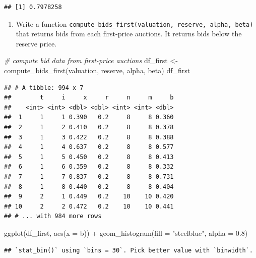 \documentclass[
]{book}
\newenvironment{Shaded}{\begin{snugshade}}{\end{snugshade}}
\newcommand{\AttributeTok}[1]{\textcolor[rgb]{0.77,0.63,0.00}{#1}}
\newcommand{\CommentTok}[1]{\textcolor[rgb]{0.56,0.35,0.01}{\textit{#1}}}
\newcommand{\FloatTok}[1]{\textcolor[rgb]{0.00,0.00,0.81}{#1}}
\newcommand{\FunctionTok}[1]{\textcolor[rgb]{0.00,0.00,0.00}{#1}}
\newcommand{\NormalTok}[1]{#1}
\newcommand{\OtherTok}[1]{\textcolor[rgb]{0.56,0.35,0.01}{#1}}
\newcommand{\SpecialCharTok}[1]{\textcolor[rgb]{0.00,0.00,0.00}{#1}}
\newcommand{\StringTok}[1]{\textcolor[rgb]{0.31,0.60,0.02}{#1}}
\providecommand{\tightlist}{%
  \setlength{\itemsep}{0pt}\setlength{\parskip}{0pt}}
\begin{document}
\begin{verbatim}
## [1] 0.7978258
\end{verbatim}

\begin{enumerate}
\def\labelenumi{\arabic{enumi}.}
\setcounter{enumi}{4}
\tightlist
\item
  Write a function \texttt{compute\_bids\_first(valuation,\ reserve,\ alpha,\ beta)} that returns bids from each first-price auctions. It returns bids below the reserve price.
\end{enumerate}

\begin{Shaded}
\begin{Highlighting}[]
\CommentTok{\# compute bid data from first{-}price auctions}
\NormalTok{df\_first }\OtherTok{\textless{}{-}} \FunctionTok{compute\_bids\_first}\NormalTok{(valuation, reserve, alpha, beta)}
\NormalTok{df\_first}
\end{Highlighting}
\end{Shaded}

\begin{verbatim}
## # A tibble: 994 x 7
##        t     i     x     r     n     m     b
##    <int> <int> <dbl> <dbl> <int> <int> <dbl>
##  1     1     1 0.390   0.2     8     8 0.360
##  2     1     2 0.410   0.2     8     8 0.378
##  3     1     3 0.422   0.2     8     8 0.388
##  4     1     4 0.637   0.2     8     8 0.577
##  5     1     5 0.450   0.2     8     8 0.413
##  6     1     6 0.359   0.2     8     8 0.332
##  7     1     7 0.837   0.2     8     8 0.731
##  8     1     8 0.440   0.2     8     8 0.404
##  9     2     1 0.449   0.2    10    10 0.420
## 10     2     2 0.472   0.2    10    10 0.441
## # ... with 984 more rows
\end{verbatim}

\begin{Shaded}
\begin{Highlighting}[]
\FunctionTok{ggplot}\NormalTok{(df\_first, }\FunctionTok{aes}\NormalTok{(}\AttributeTok{x =}\NormalTok{ b)) }\SpecialCharTok{+} \FunctionTok{geom\_histogram}\NormalTok{(}\AttributeTok{fill =} \StringTok{"steelblue"}\NormalTok{, }\AttributeTok{alpha =} \FloatTok{0.8}\NormalTok{)}
\end{Highlighting}
\end{Shaded}

\begin{verbatim}
## `stat_bin()` using `bins = 30`. Pick better value with `binwidth`.
\end{verbatim}
\end{document}
